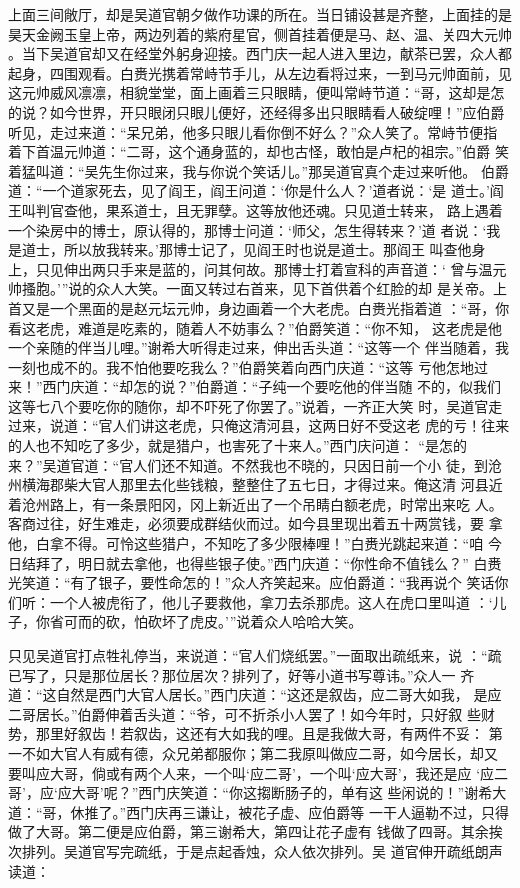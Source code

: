 上面三间敞厅，却是吴道官朝夕做作功课的所在。当日铺设甚是齐整，上面挂的是
昊天金阙玉皇上帝，两边列着的紫府星官，侧首挂着便是马、赵、温、关四大元帅
。当下吴道官却又在经堂外躬身迎接。西门庆一起人进入里边，献茶已罢，众人都
起身，四围观看。白赉光携着常峙节手儿，从左边看将过来，一到马元帅面前，见
这元帅威风凛凛，相貌堂堂，面上画着三只眼睛，便叫常峙节道：“哥，这却是怎
的说？如今世界，开只眼闭只眼儿便好，还经得多出只眼睛看人破绽哩！”应伯爵
听见，走过来道：“呆兄弟，他多只眼儿看你倒不好么？”众人笑了。常峙节便指
着下首温元帅道：“二哥，这个通身蓝的，却也古怪，敢怕是卢杞的祖宗。”伯爵
笑着猛叫道：“吴先生你过来，我与你说个笑话儿。”那吴道官真个走过来听他。
伯爵道：“一个道家死去，见了阎王，阎王问道：‘你是什么人？’道者说：‘是
道士。’阎王叫判官查他，果系道士，且无罪孽。这等放他还魂。只见道士转来，
路上遇着一个染房中的博士，原认得的，那博士问道：‘师父，怎生得转来？’道
者说：‘我是道士，所以放我转来。’那博士记了，见阎王时也说是道士。那阎王
叫查他身上，只见伸出两只手来是蓝的，问其何故。那博士打着宣科的声音道：‘
曾与温元帅搔胞。’”说的众人大笑。一面又转过右首来，见下首供着个红脸的却
是关帝。上首又是一个黑面的是赵元坛元帅，身边画着一个大老虎。白赉光指着道
：“哥，你看这老虎，难道是吃素的，随着人不妨事么？”伯爵笑道：“你不知，
这老虎是他一个亲随的伴当儿哩。”谢希大听得走过来，伸出舌头道：“这等一个
伴当随着，我一刻也成不的。我不怕他要吃我么？”伯爵笑着向西门庆道：“这等
亏他怎地过来！”西门庆道：“却怎的说？”伯爵道：“子纯一个要吃他的伴当随
不的，似我们这等七八个要吃你的随你，却不吓死了你罢了。”说着，一齐正大笑
时，吴道官走过来，说道：“官人们讲这老虎，只俺这清河县，这两日好不受这老
虎的亏！往来的人也不知吃了多少，就是猎户，也害死了十来人。”西门庆问道：
“是怎的来？”吴道官道：“官人们还不知道。不然我也不晓的，只因日前一个小
徒，到沧州横海郡柴大官人那里去化些钱粮，整整住了五七日，才得过来。俺这清
河县近着沧州路上，有一条景阳冈，冈上新近出了一个吊睛白额老虎，时常出来吃
人。客商过往，好生难走，必须要成群结伙而过。如今县里现出着五十两赏钱，要
拿他，白拿不得。可怜这些猎户，不知吃了多少限棒哩！”白赉光跳起来道：“咱
今日结拜了，明日就去拿他，也得些银子使。”西门庆道：“你性命不值钱么？”
白赉光笑道：“有了银子，要性命怎的！”众人齐笑起来。应伯爵道：“我再说个
笑话你们听：一个人被虎衔了，他儿子要救他，拿刀去杀那虎。这人在虎口里叫道
：‘儿子，你省可而的砍，怕砍坏了虎皮。’”说着众人哈哈大笑。

只见吴道官打点牲礼停当，来说道：“官人们烧纸罢。”一面取出疏纸来，说
：“疏已写了，只是那位居长？那位居次？排列了，好等小道书写尊讳。”众人一
齐道：“这自然是西门大官人居长。”西门庆道：“这还是叙齿，应二哥大如我，
是应二哥居长。”伯爵伸着舌头道：“爷，可不折杀小人罢了！如今年时，只好叙
些财势，那里好叙齿！若叙齿，这还有大如我的哩。且是我做大哥，有两件不妥：
第一不如大官人有威有德，众兄弟都服你；第二我原叫做应二哥，如今居长，却又
要叫应大哥，倘或有两个人来，一个叫‘应二哥’，一个叫‘应大哥’，我还是应
‘应二哥’，应‘应大哥’呢？”西门庆笑道：“你这搊断肠子的，单有这
些闲说的！”谢希大道：“哥，休推了。”西门庆再三谦让，被花子虚、应伯爵等
一干人逼勒不过，只得做了大哥。第二便是应伯爵，第三谢希大，第四让花子虚有
钱做了四哥。其余挨次排列。吴道官写完疏纸，于是点起香烛，众人依次排列。吴
道官伸开疏纸朗声读道：

